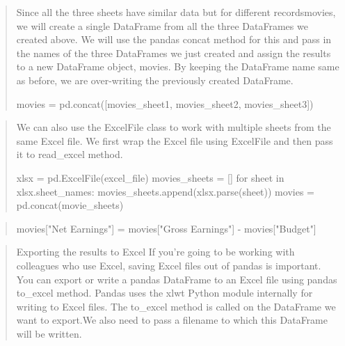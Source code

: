 \documentclass[11pt]{article}
\theoremstyle{definition}
\begin{document}
\begin{itemize}


\newpage

\begin{quote}
Since all the three sheets have similar data but for different recordsmovies, we will create a single DataFrame from all the three DataFrames we created above. We will use the pandas concat method for this and pass in the names of the three DataFrames we just created and assign the results to a new DataFrame object, movies. By keeping the DataFrame name same as before, we are over-writing the previously created DataFrame.

movies = pd.concat([movies\_sheet1, movies\_sheet2, movies\_sheet3])
\end{quote}

\begin{quote}
We can also use the ExcelFile class to work with multiple sheets from the same Excel file. We first wrap the Excel file using ExcelFile and then pass it to read\_excel method.

xlsx = pd.ExcelFile(excel\_file)
movies\_sheets = []
for sheet in xlsx.sheet\_names:
   movies\_sheets.append(xlsx.parse(sheet))
movies = pd.concat(movie\_sheets)
\end{quote}

\begin{quote}
movies["Net Earnings"] = movies["Gross Earnings"] - movies["Budget"]
\end{quote}

\begin{quote}
Exporting the results to Excel
If you’re going to be working with colleagues who use Excel, saving Excel files out of pandas is important. You can export or write a pandas DataFrame to an Excel file using pandas to\_excel method. Pandas uses the xlwt Python module internally for writing to Excel files. The to\_excel method is called on the DataFrame we want to export.We also need to pass a filename to which this DataFrame will be written.


\end{quote}
\end{itemize}
\end{document}
